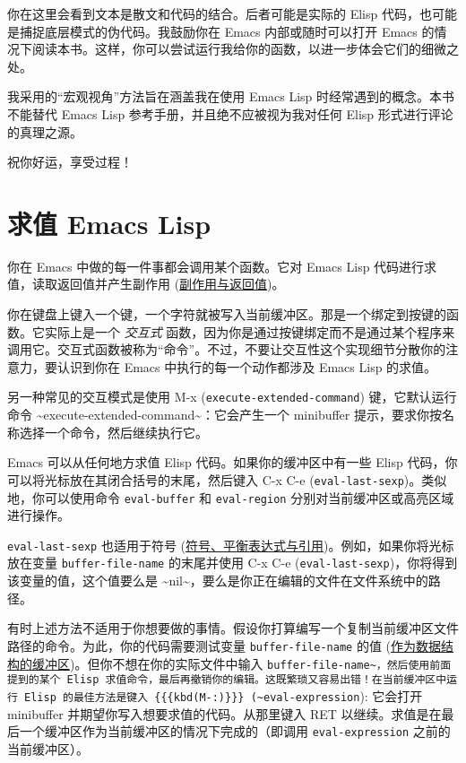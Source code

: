 \documentclass[11pt]{ctexart}
\begin{document}
你在这里会看到文本是散文和代码的结合。后者可能是实际的 Elisp 代码，也可能是捕捉底层模式的伪代码。我鼓励你在 Emacs 内部或随时可以打开 Emacs 的情况下阅读本书。这样，你可以尝试运行我给你的函数，以进一步体会它们的细微之处。

我采用的“宏观视角”方法旨在涵盖我在使用 Emacs Lisp 时经常遇到的概念。本书不能替代 Emacs Lisp 参考手册，并且绝不应被视为我对任何 Elisp 形式进行评论的真理之源。

祝你好运，享受过程！
\section{求值 Emacs Lisp}
\label{sec:org5e72a31}
你在 Emacs 中做的每一件事都会调用某个函数。它对 Emacs Lisp 代码进行求值，读取返回值并产生副作用 (\hyperref[sec:org7601617]{副作用与返回值})。

你在键盘上键入一个键，一个字符就被写入当前缓冲区。那是一个绑定到按键的函数。它实际上是一个 \emph{交互式} 函数，因为你是通过按键绑定而不是通过某个程序来调用它。交互式函数被称为“命令”。不过，不要让交互性这个实现细节分散你的注意力，要认识到你在 Emacs 中执行的每一个动作都涉及 Emacs Lisp 的求值。

另一种常见的交互模式是使用 M-x (\texttt{execute-extended-command}) 键，它默认运行命令 \textasciitilde{}execute-extended-command\textasciitilde{}：它会产生一个 minibuffer 提示，要求你按名称选择一个命令，然后继续执行它。

Emacs 可以从任何地方求值 Elisp 代码。如果你的缓冲区中有一些 Elisp 代码，你可以将光标放在其闭合括号的末尾，然后键入 C-x C-e (\texttt{eval-last-sexp})。类似地，你可以使用命令 \texttt{eval-buffer} 和 \texttt{eval-region} 分别对当前缓冲区或高亮区域进行操作。

\texttt{eval-last-sexp} 也适用于符号 (\hyperref[sec:orgb51d706]{符号、平衡表达式与引用})。例如，如果你将光标放在变量 \texttt{buffer-file-name} 的末尾并使用 C-x C-e (\texttt{eval-last-sexp})，你将得到该变量的值，这个值要么是 \textasciitilde{}nil\textasciitilde{}，要么是你正在编辑的文件在文件系统中的路径。

有时上述方法不适用于你想要做的事情。假设你打算编写一个复制当前缓冲区文件路径的命令。为此，你的代码需要测试变量 \texttt{buffer-file-name} 的值 (\hyperref[sec:orgc0d6740]{作为数据结构的缓冲区})。但你不想在你的实际文件中输入 \texttt{buffer-file-name\textasciitilde{}，然后使用前面提到的某个 Elisp 求值命令，最后再撤销你的编辑。这既繁琐又容易出错！在当前缓冲区中运行 Elisp 的最佳方法是键入 \{\{\{kbd(M-:)\}\}\} (\textasciitilde{}eval-expression}): 它会打开 minibuffer 并期望你写入想要求值的代码。从那里键入 RET 以继续。求值是在最后一个缓冲区作为当前缓冲区的情况下完成的（即调用 \texttt{eval-expression} 之前的当前缓冲区）。
\end{document}
